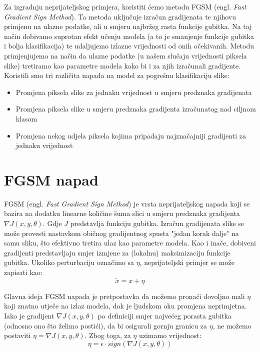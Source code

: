 Za izgradnju neprijateljskog primjera, koristiti ćemo metodu FGSM (engl. \textit{Fast Gradient Sign Method}). Ta metoda uključuje izračun gradijenata te njihovu primjenu na ulazne podatke, ali u smjeru najbržeg rasta funkcije gubitka. Na taj način dobivamo suprotan efekt učenju modela (a to je smanjenje funkcije gubitka i bolja klasifikacija) te udaljujemo izlazne vrijednosti od onih očekivanih. Metodu primjenjujemo na način da ulazne podatke (u našem slučaju vrijednosti piksela slike) tretiramo kao parametre modela kako bi i za njih izračunali gradijente. \\

Koristili smo tri različita napada na model za pogrešnu klasifikaciju slike: 
\begin{itemize}
    \item Promjena piksela slike za jednaku vrijednost u smjeru predznaka gradijenata
    \item Promjena piksela slike u smjeru predznaka gradijenta izračunatog nad ciljnom klasom
    \item Promjena nekog udjela piksela kojima pripadaju najznačajniji gradijenti za jednaku vrijednost
\end{itemize}

\section{FGSM napad}

FGSM (engl. \textit{Fast Gradient Sign Method}) je vrsta neprijateljskog napada koji se bazira na dodatku linearne količine šuma slici u smjeru predznaka gradijenta $\nabla J(x, y, \theta)$. Gdje $J$ predstavlja funkciju gubitka. Izračun gradijenata slike se može provesti nastavkom običnog gradijentnog spusta "jedan korak dalje" na samu sliku, što efektivno tretira ulaz kao parametre modela. Kao i inače, dobiveni gradijenti predstavljaju smjer izmjene za (lokalnu) maksimizaciju funkcije gubitka. Ukoliko perturbaciju označimo sa $\eta$, neprijateljski primjer se može zapisati kao: 
\[\widetilde{x} = x + \eta\]

Glavna ideja FGSM napada je pretpostavka da možemo pronaći dovoljno mali $\eta$ koji znatno utječe na izlaz modela, dok je ljudskom oku promjena neprimjetna. Iako je gradijent $\nabla J(x, y, \theta)$ po definiciji smjer najvećeg porasta gubitka (odnosno ono što želimo postići), da bi osigurali gornju granicu za $\eta$, ne možemo postaviti $\eta = \nabla J(x, y, \theta)$. Zbog toga, za $\eta$ uzimamo vrijednost: 
\[\eta = \epsilon \cdot sign\left(\nabla J(x, y, \theta)\right)\]

